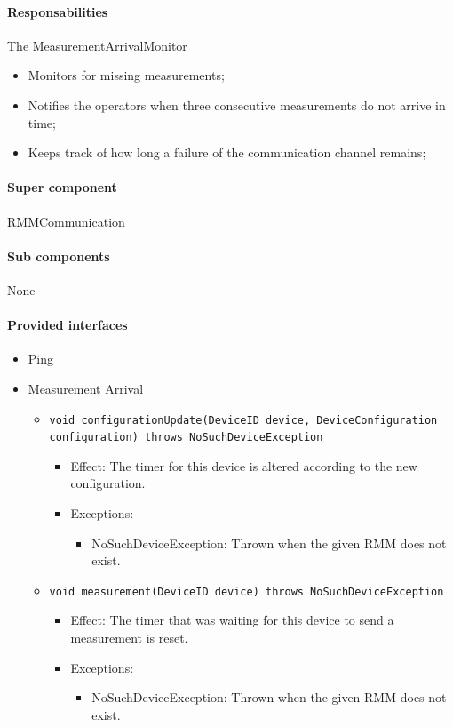 \documentclass[a4paper,10pt]{article}
\begin{document}
\paragraph{Responsabilities} 
The MeasurementArrivalMonitor
\begin{itemize}
	\item Monitors for missing measurements;
    \item Notifies the operators when three consecutive measurements do not arrive in time;
    \item Keeps track of how long a failure of the communication channel remains;
\end{itemize}

\paragraph{Super component} RMMCommunication

\paragraph{Sub components} None

\paragraph{Provided interfaces}
\begin{itemize}
    \item Ping

    \item Measurement Arrival
    \begin{itemize}
    	\item \texttt{void configurationUpdate(DeviceID device, DeviceConfiguration configuration) throws NoSuchDeviceException}
    	\begin{itemize}
            \item Effect: The timer for this device is altered according to the new configuration.
            \item Exceptions:
            \begin{itemize}
                \item NoSuchDeviceException: Thrown when the given RMM does not exist.
            \end{itemize}
        \end{itemize}
    
        \item \texttt{void measurement(DeviceID device) throws NoSuchDeviceException}
        \begin{itemize}
            \item Effect: The timer that was waiting for this device to send a measurement is reset.
            \item Exceptions:
            \begin{itemize}
                \item NoSuchDeviceException: Thrown when the given RMM does not exist.
            \end{itemize}
        \end{itemize}
    \end{itemize}
\end{itemize}
\end{document}

